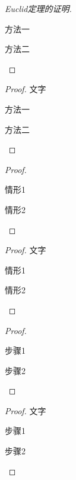 \documentclass{xdyy-usermanual}
\begin{document}
\begin{vexample}
    \begin{proof}[Euclid定理的证明]
      \begin{method}
        \item 方法一
        \item 方法二
      \end{method}
    \end{proof}
    
    \begin{proof}
      文字
      \begin{method}
        \item 方法一
        \item 方法二
      \end{method}
    \end{proof}
\end{vexample}


\begin{vexample}
    \begin{proof}
      \begin{case}
        \item 情形1
        \item 情形2
      \end{case}
    \end{proof}
    
    \begin{proof}
      文字
      \begin{case}
        \item 情形1
        \item 情形2
      \end{case}
    \end{proof}
\end{vexample}

\begin{vexample}
    \begin{proof}
      \begin{step}
        \item 步骤1
        \item 步骤2
      \end{step}
    \end{proof}
    
    \begin{proof}
      文字
      \begin{step}
        \item 步骤1
        \item 步骤2
      \end{step}
    \end{proof}
\end{vexample}
\end{document}
